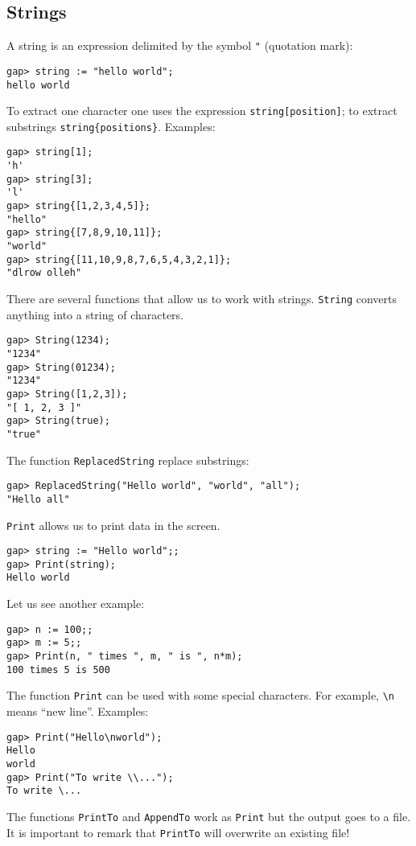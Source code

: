 \subsection*{Strings}

A string is an expression delimited by the symbol 
\lstinline{"} (quotation mark): 
\begin{lstlisting}
gap> string := "hello world";
hello world
\end{lstlisting}
To extract one character one uses the expression \lstinline{string[position]};
to extract substrings \lstinline|string{positions}|. Examples:
\begin{lstlisting}
gap> string[1];
'h'
gap> string[3];
'l'
gap> string{[1,2,3,4,5]};
"hello"
gap> string{[7,8,9,10,11]};
"world"
gap> string{[11,10,9,8,7,6,5,4,3,2,1]};
"dlrow olleh"
\end{lstlisting}

There are several functions that allow us to work with strings.
\lstinline{String} converts anything into a string of characters.
\begin{lstlisting}
gap> String(1234);
"1234"
gap> String(01234);
"1234"
gap> String([1,2,3]);
"[ 1, 2, 3 ]"
gap> String(true);
"true"
\end{lstlisting}
The function \lstinline{ReplacedString} replace substrings: 
\begin{lstlisting}
gap> ReplacedString("Hello world", "world", "all");
"Hello all"
\end{lstlisting}

\lstinline{Print} allows us to print data in the screen. 
\begin{lstlisting}
gap> string := "Hello world";;
gap> Print(string);
Hello world
\end{lstlisting}
Let us see another example:
\begin{lstlisting}
gap> n := 100;;                                                       
gap> m := 5;;
gap> Print(n, " times ", m, " is ", n*m);
100 times 5 is 500
\end{lstlisting}
The function \lstinline{Print} can be used with some special characters. For example, 
\lstinline{\n} means ``new line''. Examples:
\begin{lstlisting}
gap> Print("Hello\nworld");
Hello
world
gap> Print("To write \\...");
To write \... 
\end{lstlisting}
The functions \lstinline{PrintTo} and \lstinline{AppendTo} work as \lstinline{Print} but the output goes
to a file. It is important to remark that \lstinline{PrintTo} will overwrite an existing file!

